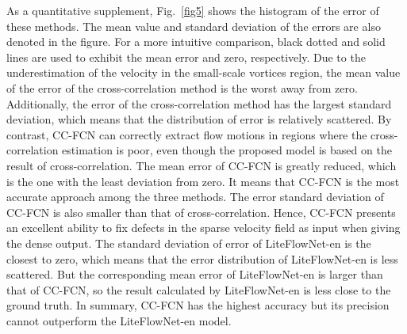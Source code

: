 \documentclass[%
 aip,
 amsmath,amssymb,
 reprint,%
]{revtex4-1}
\begin{document}
As a quantitative supplement, Fig.~\ref{fig5} shows the histogram of the error of these methods. The mean value and standard deviation of the errors are also denoted in the figure.
For a more intuitive comparison, black dotted and solid lines are used to exhibit the mean error and zero, respectively.
Due to the underestimation of the velocity in the small-scale vortices region, the mean value of the error of the cross-correlation method is the worst away from zero. Additionally, the error of the cross-correlation method has the largest standard deviation, which means that the distribution of error is relatively scattered.
By contrast, CC-FCN can correctly extract flow motions in regions where the cross-correlation estimation is poor, even though the proposed model is based on the result of cross-correlation.
The mean error of CC-FCN is greatly reduced, which is the one with the least deviation from zero. 
It means that CC-FCN is the most accurate approach among the three methods.
The error standard deviation of CC-FCN is also smaller than that of cross-correlation.
Hence, CC-FCN presents an excellent ability to fix defects in the sparse velocity field as input when giving the dense output.
The standard deviation of error of LiteFlowNet-en is the closest to zero, which means that the error distribution of LiteFlowNet-en is less scattered. 
But the corresponding mean error of LiteFlowNet-en is larger than that of CC-FCN, so the result calculated by LiteFlowNet-en is less close to the ground truth.
In summary, CC-FCN has the highest accuracy but its precision cannot outperform the LiteFlowNet-en model.
\end{document}
